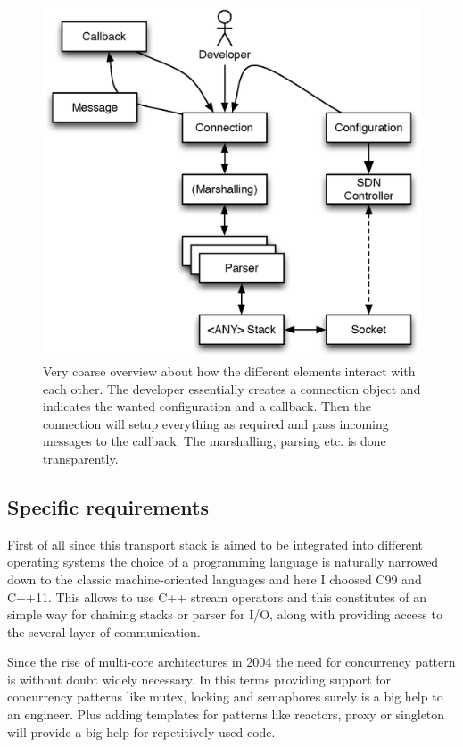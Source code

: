 \documentclass[twocolumn,english]{IEEEtran}
\theoremstyle{plain}
\theoremstyle{plain}
\begin{document}
\begin{figure}[h]
\includegraphics[width=\columnwidth]{Concept.eps}
\caption{Very coarse overview about how the different elements interact with
each other. The developer essentially creates a connection object and
indicates the wanted configuration and a callback. Then the connection will
setup everything as required and pass incoming messages to the callback. The
marshalling, parsing etc. is done transparently.}
\label{fig:concept}
\end{figure}

\subsection{Specific requirements}

First of all since this transport stack is aimed to be integrated into
different operating systems the choice of a programming language is naturally
narrowed down to the classic machine-oriented languages and here I choosed C99
and C++11. This allows to use C++ stream operators and this constitutes of an
simple way for chaining stacks or parser for I/O, along with providing access
to the several layer of communication.

Since the rise of multi-core architectures in
2004\cite{amd:first-multicore-x86} the need for concurrency pattern is without
doubt widely necessary. In this terms providing support for concurrency
patterns like mutex, locking and semaphores surely is a big help to an
engineer. Plus adding templates for patterns like reactors, proxy or singleton
will provide a big help for repetitively used code.
\end{document}
